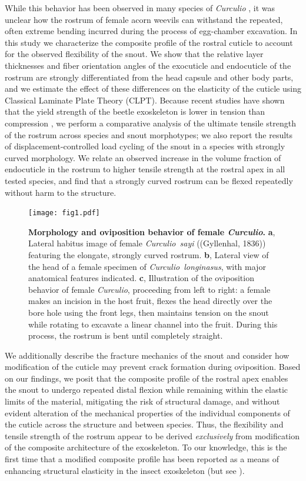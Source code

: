\documentclass[twocolumn, linenumbers, superscriptaddress, nofootinbib]{revtex4-1}
\begin{document}
	While this behavior has been observed in many species of \textit{Curculio} \cite{Gibson1969, Moffett1989, AguirreUribe1978, Toju2005}, it was unclear how the rostrum of female acorn weevils can withstand the repeated, often extreme bending incurred during the process of egg-chamber excavation.
	In this study we characterize the composite profile of the rostral cuticle to account for the observed flexibility of the snout.
	We show that the relative layer thicknesses and fiber orientation angles of the exocuticle and endocuticle of the rostrum are strongly differentiated from the head capsule and other body parts, and we estimate the effect of these differences on the elasticity of the cuticle using Classical Laminate Plate Theory (CLPT).
	Because recent studies have shown that the yield strength of the beetle exoskeleton is lower in tension than compression \cite{Longhai2017}, we perform a comparative analysis of the ultimate tensile strength of the rostrum across species and snout morphotypes; we also report the results of displacement-controlled load cycling of the snout in a species with strongly curved morphology.
	We relate an observed increase in the volume fraction of endocuticle in the rostrum to higher tensile strength at the rostral apex in all tested species, and find that a strongly curved rostrum can be flexed repeatedly without harm to the structure.
	
	\begin{figure}
		\centering
		\texttt{[image: fig1.pdf]}
		\caption{\textbf{Morphology and oviposition behavior of female \textit{Curculio}.} 
			\textbf{a}, Lateral habitus image of female \textit{Curculio~sayi} ((Gyllenhal, 1836)) featuring the elongate, strongly curved rostrum.
			\textbf{b}, Lateral view of the head of a female specimen of \textit{Curculio~longinasus}, with major anatomical features indicated.
			\textbf{c}, Illustration of the oviposition behavior of female \textit{Curculio}, proceeding from left to right: a female makes an incision in the host fruit, flexes the head directly over the bore hole using the front legs, then maintains tension on the snout while rotating to excavate a linear channel into the fruit. During this process, the rostrum is bent until completely straight.
		}
		\label{fig::curculio}
	\end{figure}
	
	We additionally describe the fracture mechanics of the snout and consider how modification of the cuticle may prevent crack formation during oviposition.
	Based on our findings, we posit that the composite profile of the rostral apex enables the snout to undergo repeated distal flexion while remaining within the elastic limits of the material, mitigating the risk of structural damage, and without evident alteration of the mechanical properties of the individual components of the cuticle across the structure and between species.
	Thus, the flexibility and tensile strength of the rostrum appear to be derived \emph{exclusively} from modification of the composite architecture of the exoskeleton.
	To our knowledge, this is the first time that a modified composite profile has been reported as a means of enhancing structural elasticity in the insect exoskeleton (but see \cite{Matsumura2017}).
	
\end{document}
